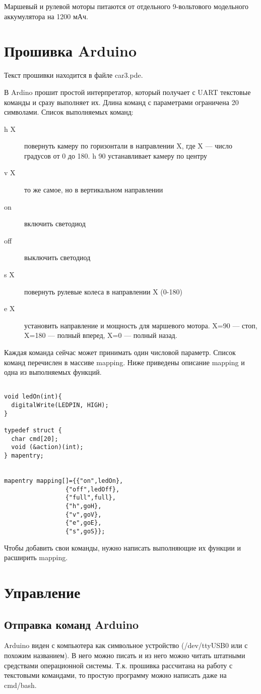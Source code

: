 \documentclass[a4paper]{article}
\begin{document}
Маршевый и рулевой моторы питаются от отдельного 9-вольтового модельного аккумулятора на 1200 мАч.

\section{Прошивка Arduino}
Текст прошивки находится в файле car3.pde.

В Ardino прошит простой интерпретатор, который получает с UART текстовые команды и сразу выполняет их. Длина команд с параметрами ограничена 20 символами. Список выполняемых команд:
\begin{description}
\item[h X] повернуть камеру по горизонтали в направлении X, где X --- число градусов от 0 до 180. h 90 устанавливает камеру по центру
\item[v X] то же самое, но в вертикальном направлении
\item[on] включить светодиод
\item[off] выключить светодиод
\item[s X] повернуть рулевые колеса в направлении X (0-180)
\item[e X] установить направление и мощность для маршевого мотора. X=90 --- стоп, X=180 --- полный вперед, X=0 --- полный назад.
\end{description}

Каждая команда сейчас может принимать один числовой параметр. Список команд перечислен в массиве mapping. Ниже приведены описание mapping и одна из выполняемых функций.
\begin{verbatim}

void ledOn(int){
  digitalWrite(LEDPIN, HIGH);
}

typedef struct {
  char cmd[20];
  void (&action)(int);
} mapentry;


mapentry mapping[]={{"on",ledOn},
			     {"off",ledOff},
			     {"full",full},
			     {"h",goH},
			     {"v",goV},
			     {"e",goE},
			     {"s",goS}};
\end{verbatim}

Чтобы добавить свои команды, нужно написать выполняющие их функции и расширить mapping.

\section{Управление}
\subsection{Отправка команд Arduino}
Arduino виден с компьютера как символьное устройство (/dev/ttyUSB0 или с похожим названием). В него можно писать и из него можно читать штатными средствами операционной системы. Т.к. прошивка рассчитана на работу с текстовыми командами, то простую программу можно написать даже на cmd/bash.
\end{document}
